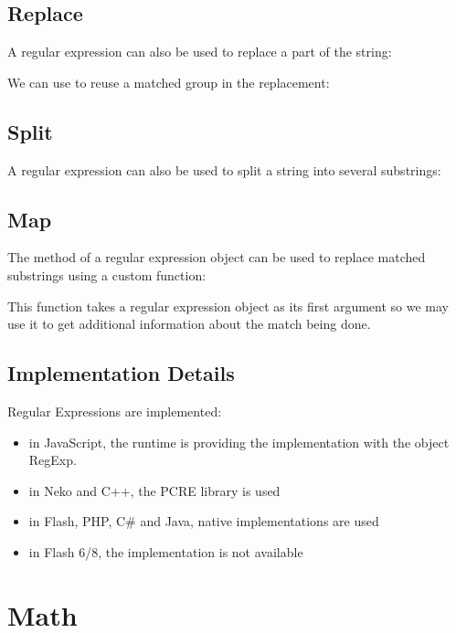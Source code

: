 \subsection{Replace}
\label{std-regex-replace}

A regular expression can also be used to replace a part of the string:


We can use  to reuse a matched group in the replacement:


\subsection{Split}
\label{std-regex-split}

A regular expression can also be used to split a string into several substrings:


\subsection{Map}
\label{std-regex-map}

The  method of a regular expression object can be used to replace matched substrings using a custom function:


This function takes a regular expression object as its first argument so we may use it to get additional information about the match being done.

\subsection{Implementation Details}
\label{std-regex-implementation-details}

Regular Expressions are implemented:
\begin{itemize}
	\item in JavaScript, the runtime is providing the implementation with the object RegExp.
	\item in Neko and C++, the PCRE library is used
	\item in Flash, PHP, C\# and Java, native implementations are used
	\item in Flash 6/8, the implementation is not available
\end{itemize}


\section{Math}
\label{std-math}

